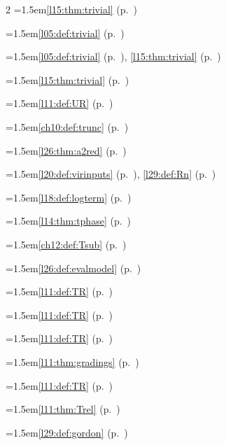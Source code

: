 \begin{multicols}{2}
\hangindent=1.5em\quad \ref{l15:thm:trivial} (p.~\pageref{l15:thm:trivial})\par
\hangindent=1.5em\quad \ref{l05:def:trivial} (p.~\pageref{l05:def:trivial})\par
\hangindent=1.5em\quad \ref{l05:def:trivial} (p.~\pageref{l05:def:trivial}), \ref{l15:thm:trivial} (p.~\pageref{l15:thm:trivial})\par
\hangindent=1.5em\quad \ref{l15:thm:trivial} (p.~\pageref{l15:thm:trivial})\par
\hangindent=1.5em\quad \ref{l11:def:UR} (p.~\pageref{l11:def:UR})\par
\hangindent=1.5em\quad \ref{ch10:def:trunc} (p.~\pageref{ch10:def:trunc})\par
\hangindent=1.5em\quad \ref{l26:thm:a2red} (p.~\pageref{l26:thm:a2red})\par
\hangindent=1.5em\quad \ref{l20:def:virinputs} (p.~\pageref{l20:def:virinputs}), \ref{l29:def:Rn} (p.~\pageref{l29:def:Rn})\par
\hangindent=1.5em\quad \ref{l18:def:logterm} (p.~\pageref{l18:def:logterm})\par
\hangindent=1.5em\quad \ref{l14:thm:tphase} (p.~\pageref{l14:thm:tphase})\par
\hangindent=1.5em\quad \ref{ch12:def:Tsub} (p.~\pageref{ch12:def:Tsub})\par
\hangindent=1.5em\quad \ref{l26:def:evalmodel} (p.~\pageref{l26:def:evalmodel})\par
\hangindent=1.5em\quad \ref{l11:def:TR} (p.~\pageref{l11:def:TR})\par
\hangindent=1.5em\quad \ref{l11:def:TR} (p.~\pageref{l11:def:TR})\par
\hangindent=1.5em\quad \ref{l11:def:TR} (p.~\pageref{l11:def:TR})\par
\hangindent=1.5em\quad \ref{l11:thm:gradings} (p.~\pageref{l11:thm:gradings})\par
\hangindent=1.5em\quad \ref{l11:def:TR} (p.~\pageref{l11:def:TR})\par
\hangindent=1.5em\quad \ref{l11:thm:Trel} (p.~\pageref{l11:thm:Trel})\par
\hangindent=1.5em\quad \ref{l29:def:gordon} (p.~\pageref{l29:def:gordon})\par

\end{multicols}
